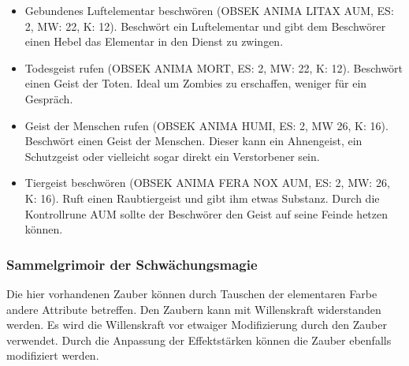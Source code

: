 \documentclass{article}
\begin{document}
\begin{itemize}
\item Gebundenes Luftelementar beschwören (OBSEK ANIMA LITAX AUM, ES: 2, MW: 22, K: 12). Beschwört ein Luftelementar und gibt dem Beschwörer einen Hebel das Elementar in den Dienst zu zwingen.
\end{itemize}

\begin{itemize}
\item Todesgeist rufen (OBSEK ANIMA MORT, ES: 2, MW: 22, K: 12). Beschwört einen Geist der Toten. Ideal um Zombies zu erschaffen, weniger für ein Gespräch.
\end{itemize}

\begin{itemize}
\item Geist der Menschen rufen (OBSEK ANIMA HUMI, ES: 2, MW 26, K: 16). Beschwört einen Geist der Menschen. Dieser kann ein Ahnengeist, ein Schutzgeist oder vielleicht sogar direkt ein Verstorbener sein.
\end{itemize}

\begin{itemize}
\item Tiergeist beschwören (OBSEK ANIMA FERA NOX AUM, ES: 2, MW: 26, K: 16). Ruft einen Raubtiergeist und gibt ihm etwas Substanz. Durch die Kontrollrune AUM sollte der Beschwörer den Geist auf seine Feinde hetzen können.
\end{itemize}

\subsubsection{Sammelgrimoir der Schwächungsmagie}

Die hier vorhandenen Zauber können durch Tauschen der elementaren Farbe andere Attribute betreffen. Den Zaubern kann
mit Willenskraft widerstanden werden. Es wird die Willenskraft vor etwaiger Modifizierung durch den Zauber verwendet.
Durch die Anpassung der Effektstärken können die Zauber ebenfalls modifiziert werden.
\end{document}
